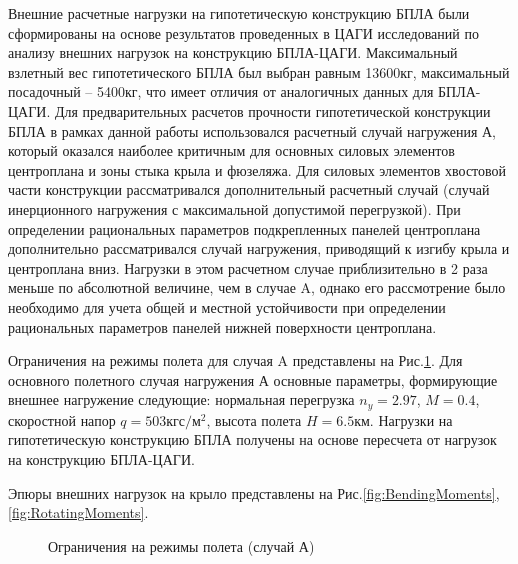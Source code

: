 Внешние расчетные нагрузки на гипотетическую конструкцию БПЛА были сформированы на основе результатов проведенных в ЦАГИ исследований \cite{BPS_TSAGI} по анализу внешних нагрузок на конструкцию БПЛА-ЦАГИ. Максимальный взлетный вес гипотетического БПЛА был выбран равным 13600кг, максимальный посадочный -- 5400кг, что имеет отличия от аналогичных данных для БПЛА-ЦАГИ. Для предварительных расчетов прочности гипотетической конструкции БПЛА в рамках данной работы использовался расчетный случай нагружения А, который оказался наиболее критичным для основных силовых элементов центроплана и зоны стыка крыла и фюзеляжа. Для силовых элементов хвостовой части конструкции рассматривался дополнительный расчетный случай (случай инерционного нагружения с максимальной допустимой перегрузкой). При определении рациональных параметров подкрепленных панелей центроплана дополнительно рассматривался случай нагружения, приводящий к изгибу крыла и центроплана вниз. Нагрузки в этом расчетном случае приблизительно в 2 раза меньше по абсолютной величине, чем в случае A, однако его рассмотрение было необходимо для учета общей и местной устойчивости при определении рациональных параметров панелей нижней поверхности центроплана.



Ограничения на режимы полета для случая A представлены на Рис.\ref{fig:ModeOfFlight}. Для основного полетного случая нагружения А основные параметры, формирующие внешнее нагружение следующие: нормальная перегрузка $n_y = 2.97$, $M = 0.4$, скоростной напор $q = 503 \text{кгс}/\text{м}^2$, высота полета $H = 6.5\text{км}$. Нагрузки на гипотетическую конструкцию БПЛА получены на основе пересчета от нагрузок на конструкцию БПЛА-ЦАГИ.


Эпюры внешних нагрузок на крыло представлены на Рис.\ref{fig:BendingMoments},\ref{fig:RotatingMoments}.





\begin{figure}[H]
\centering
\def\svgwidth{0.9\textwidth}

\caption{Ограничения на режимы полета (случай А)}
\label{fig:ModeOfFlight}
\end{figure}


